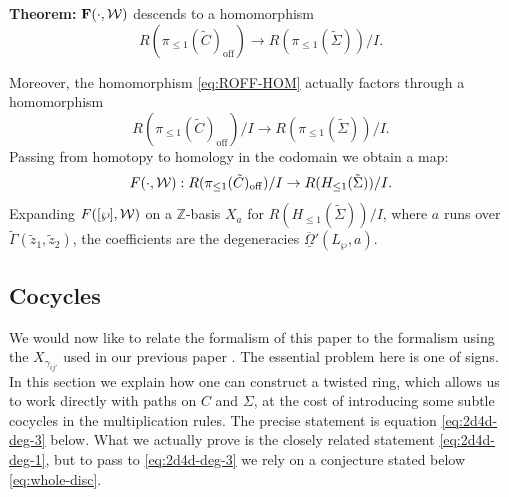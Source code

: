 \documentclass[11pt,a4paper]{article}
\def\wnet {{\cal W}}
\def\bF{\mathbf{F}}
\def\wnet {{\cal W}}
\newcommand\fro{{\overline{\underline{\Omega}}}}
\newcommand\off{{\mathrm{off}}}
\begin{document}
\medskip
\textbf{Theorem:} $\bF(\cdot, \wnet)$ descends to a homomorphism
\begin{equation}\label{eq:ROFF-HOM}
R(\pi_{\leq 1}(\tilde C)_{\off} ) \to R(\pi_{\leq 1}(\tilde \Sigma))/I.
\end{equation}

Moreover, the homomorphism \eqref{eq:ROFF-HOM} actually
factors through a homomorphism
\begin{equation}
R(\pi_{\leq 1}(\tilde C)_{\off} )/I \to R(\pi_{\leq 1}(\tilde \Sigma))/I.
\end{equation}
Passing from homotopy to homology in the codomain we obtain a map:
\begin{equation}\label{eq:R-MOD-I}
F(\cdot, \wnet): R(\pi_{\leq 1}(\tilde C)_{\off} )/I \to R(H_{\leq 1}(\tilde \Sigma))/I.
\end{equation}
Expanding  $F([\wp],\wnet)$ on a ${\mathbb Z}$-basis $X_{a}$ for  $R(H_{\leq 1}(\tilde \Sigma))/I$,
where $a$ runs over $\tilde\Gamma(\tilde z_1, \tilde z_2)$,
the coefficients are  the degeneracies $\fro'(L_{\wp},a)$.



\subsection{Cocycles}\label{subsec:2d4d-degen}

We would now like to relate the formalism of this paper to the formalism using the
$X_{\gamma_{ij'}}$ used in our previous
paper \cite{Gaiotto:2011tf}.  The essential problem here is one of signs.
In this section we explain how one can construct a twisted ring, which
allows us to work directly with paths on $C$ and $\Sigma$, at the cost of introducing
some subtle cocycles in the multiplication rules. The precise statement is
equation \eqref{eq:2d4d-deg-3} below. What we actually prove is the closely
related statement \eqref{eq:2d4d-deg-1}, but to pass to  \eqref{eq:2d4d-deg-3}
we rely on a conjecture stated below \eqref{eq:whole-disc}.
\end{document}
